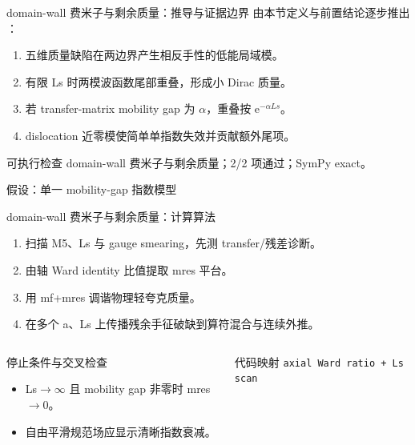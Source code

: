 \begin{frame}[t]{domain-wall 费米子与剩余质量：推导与证据边界}
\footnotesize
{}\quad 由本节定义与前置结论逐步推出 ：
\begin{enumerate}
\item 五维质量缺陷在两边界产生相反手性的低能局域模。
\item 有限 Ls 时两模波函数尾部重叠，形成小 Dirac 质量。
\item 若 transfer-matrix mobility gap 为 \ensuremath{\alpha}，重叠按 e\ensuremath{^{-\alpha{}Ls}}。
\item dislocation 近零模使简单单指数失效并贡献额外尾项。
\end{enumerate}\begin{block}{可执行检查}
\quad domain-wall 费米子与剩余质量；2/2 项通过；SymPy exact。
\par\scriptsize 假设：单一 mobility-gap 指数模型
\end{block}
\end{frame}

\begin{frame}[t]{domain-wall 费米子与剩余质量：计算算法}
\footnotesize
{}\begin{enumerate}
\item 扫描 M5、Ls 与 gauge smearing，先测 transfer/\allowbreak{}残差诊断。
\item 由轴 Ward identity 比值提取 mres 平台。
\item 用 mf+mres 调谐物理轻夸克质量。
\item 在多个 a、Ls 上传播残余手征破缺到算符混合与连续外推。
\end{enumerate}\begin{columns}[T,onlytextwidth]
\begin{block}{停止条件与交叉检查}\scriptsize\begin{itemize}
\item[\CheckMark] Ls\ensuremath{\rightarrow}\ensuremath{\infty} 且 mobility gap 非零时 mres\ensuremath{\rightarrow}0。
\item[\CheckMark] 自由平滑规范场应显示清晰指数衰减。
\end{itemize}\end{block}
\begin{block}{代码映射}
\scriptsize \texttt{axial Ward ratio + Ls scan}
\end{block}\end{columns}\end{frame}

